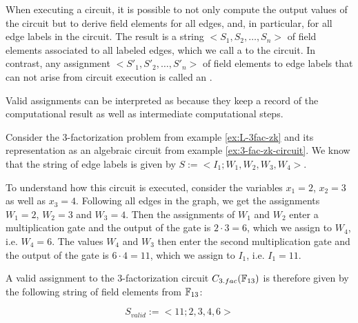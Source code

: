 When executing a circuit, it is possible to not only compute the output values of the circuit but to derive field elements for all edges, and, in particular, for all edge labels in the circuit. The result is a string $<S_1,S_2,\ldots, S_n>$ of field elements associated to all labeled edges, which we call a  to the circuit. In contrast, any assignment $<S'_1,S'_2,\ldots, S'_n>$ of field elements to edge labels that can not arise from circuit execution is called an .

Valid assignments can be interpreted as  because they keep a record of the computational result as well as intermediate computational steps. 
\begin{example}[3-factorization]
\label{ex:3-fac-zk-circuit_2}
Consider the $3$-factorization problem from example \ref{ex:L-3fac-zk} and its representation as an algebraic circuit from example \ref{ex:3-fac-zk-circuit}. We know that the string of edge labels is given by $S:=<I_{1};W_{1},W_{2},W_{3}, W_{4}>$. 

To understand how this circuit is executed, consider the variables $x_1=2$, $x_2=3$ as well as $x_3=4$. Following all edges in the graph, we get the assignments $W_1=2$, $W_2=3$ and $W_3=4$. Then the assignments of $W_1$ and $W_2$ enter a multiplication gate and the output of the gate is $2\cdot 3 = 6$, which we assign to $W_4$, i.e. $W_4=6$. The values $W_4$ and $W_3$ then enter the second multiplication gate and the output of the gate is $6\cdot 4 = 11$, which we assign to $I_1$, i.e. $I_1=11$. 

A valid assignment to the 3-factorization circuit $C_{3.fac}(\mathbb{F}_{13})$ is therefore given by the following string of field elements from $\mathbb{F}_{13}$:

\begin{equation}\label{C3fac}
S_{valid}:=<11;2,3,4,6>
\end{equation}


\end{example}
